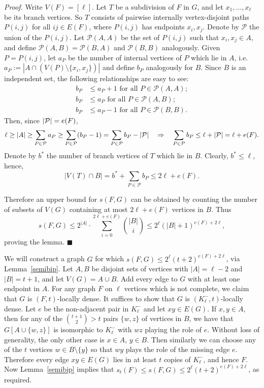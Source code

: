 \documentclass[12pt]{amsart}
\begin{document}
\medskip
\noindent
\emph{Proof.}
Write $V(F) = [\ell]$.
Let $T$ be a subdivision of $F$ in $G$, and let $x_1,\ldots,x_\ell$ be its branch vertices.
So $T$ consists of pairwise internally vertex-disjoint paths $P(i,j)$ for all $ij \in E(F)$, where $P(i,j)$ has endpoints $x_i,x_j$.
Denote by $\mathcal{P}$ the union of the $P(i,j)$.
Let $\mathcal{P}(A,A)$ be the set of $P(i,j)$ such that $x_i,x_j \in A$, and define $\mathcal{P}(A,B) = \mathcal{P}(B,A)$ and $\mathcal{P}(B,B)$ analogously.
Given $P = P(i,j)$, let $a_P$ be the number of internal vertices of $P$ which lie in $A$, i.e.~$a_P := |A \cap (V(P)\setminus \lbrace x_i,x_j \rbrace)|$ and define $b_P$ analogously for $B$.
Since $B$ is an independent set, the following relationships are easy to see:
\begin{align*}
b_P &\leq a_P+1 \text{ for all } P \in \mathcal{P}(A,A);\\
b_P &\leq a_P \text{ for all } P \in \mathcal{P}(A,B);\\
b_P &\leq a_P-1 \text{ for all } P \in \mathcal{P}(B,B).
\end{align*}
Then, since $|\mathcal{P}|= e(F)$,
\begin{align*}
\ell \geq |A| \geq \sum_{P \in \mathcal{P}}a_P \geq \sum_{P \in \mathcal{P}}(b_P-1)=\sum_{P \in \mathcal{P}}b_P-|\mathcal{P}|\quad \Rightarrow \quad \sum_{P \in \mathcal{P}}b_P \le \ell+|\mathcal{P}|= \ell+e(F).
\end{align*}
Denote by $b^*$ the number of branch vertices of $T$ which lie in $B$. Clearly, $b^*\le \ell$, hence, 
$$|V(T) \cap B| = b^* + \sum_{P \in \mathcal{P}}b_P \leq 2\ell + e(F).$$

Therefore an upper bound for $s(F,G)$ can be obtained by counting the number of subsets of $V(G)$ containing at most $2\ell+e(F)$ vertices in $B$.
Thus
$$
s(F,G) \leq 2^{|A|} \cdot \sum_{i = 0}^{2\ell + e(F)} \binom{|B|}{i} \leq 2^{\ell} (|B|+1)^{e(F)+2\ell},
$$
proving the lemma.
\hfill$\blacksquare$

\medskip
\noindent
We will construct a graph $G$ for which $s(F,G) \leq 2^\ell(t+2)^{e(F)+2\ell}$, via Lemma~\ref{semibip}.
Let $A,B$ be disjoint sets of vertices with $|A|=\ell-2$ and $|B| = t+1$, and let $V(G) = A \cup B$.
Add every edge to $G$ with at least one endpoint in $A$.
For any graph $F$ on $\ell$ vertices which is not complete, we claim that $G$ is $(F,t)$-locally dense.
It suffices to show that $G$ is $(K_\ell^- ,t)$-locally dense. Let $e$ be the non-adjacent pair in $K_\ell^-$ and let $xy \in E(G)$.
If $x,y \in A$, then for any of the $\binom{t+1}{2}>t$ pairs $\lbrace w,z \rbrace$ of vertices in $B$, we have that $G[A \cup \lbrace w,z \rbrace]$ is isomorphic to $K_\ell^-$ with $wz$ playing the role of $e$.
Without loss of generality, the only other case is $x \in A$, $y \in B$.
Then similarly we can choose any of the $t$ vertices $w \in B \setminus \lbrace y \rbrace$ so that $wy$ plays the role of the missing edge $e$.
Therefore every edge $xy \in E(G)$ lies in at least $t$ copies of $K_\ell^-$, and hence $F$.
Now Lemma~\ref{semibip} implies that $s_t(F) \leq s(F,G) \leq 2^\ell(t+2)^{e(F)+2\ell}$, as required.
\end{document}
